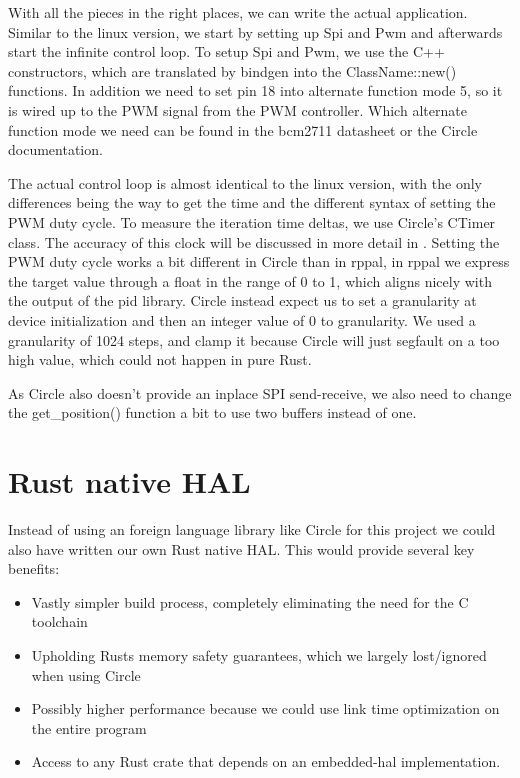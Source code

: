 With all the pieces in the right places, we can write the actual application.
Similar to the linux version, we start by setting up Spi and Pwm and afterwards start the infinite control loop.
To setup Spi and Pwm, we use the C++ constructors, which are translated by bindgen into the ClassName::new() functions.
In addition we need to set pin 18 into alternate function mode 5, so it is wired up to the PWM signal from the PWM controller.
Which alternate function mode we need can be found in the bcm2711 datasheet or the Circle documentation.



The actual control loop is almost identical to the linux version, with the only differences being the way to get the time and the different syntax of setting the PWM duty cycle.
To measure the iteration time deltas, we use Circle's CTimer class. The accuracy of this clock will be discussed in more detail in .
Setting the PWM duty cycle works a bit different in Circle than in rppal,
in rppal we express the target value through a float in the range of 0 to 1,
which aligns nicely with the output of the pid library.
Circle instead expect us to set a granularity at device initialization and then an integer value of 0 to granularity.
We used a granularity of 1024 steps, and clamp it because Circle will just segfault on a too high value, which could not happen in pure Rust.



As Circle also doesn't provide an inplace SPI send-receive, we also need to change the get\_position() function a bit to use two buffers instead of one.


\section{Rust native HAL}
\label{sec:concept_and_implementation:hal}

Instead of using an foreign language library like Circle for this project we could also have written our own Rust native HAL.
This would provide several key benefits:
\begin{itemize}
    \item Vastly simpler build process, completely eliminating the need for the C toolchain
    \item Upholding Rusts memory safety guarantees, which we largely lost/ignored when using Circle
    \item Possibly higher performance because we could use link time optimization on the entire program
    \item Access to any Rust crate that depends on an embedded-hal implementation.
\end{itemize}

